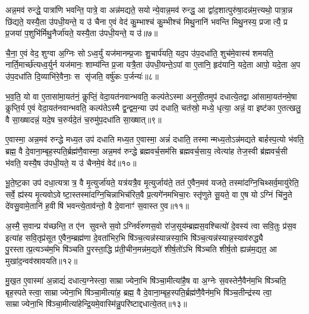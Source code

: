 अन्न॒मव॑ रुन्द्धे॒ पात्रा॑णि भवन्ति॒ पात्रे॒ वा अन्न॑मद्यते॒ सयोन्ये॒वान्न॒मव॑ रुन्द्ध॒ आ द्वा॑द॒शात्पुरु॑षा॒दन्न॑म॒त्त्यथो॒ पात्रा॒न्न छि॑द्यते॒ यस्यै॒ता उ॑पधी॒यन्ते॒ य उ॑ चैना ए॒वं वेद॑ कु॒म्भाश्च॑ कु॒म्भीश्च॑ मिथु॒नानि॑ भवन्ति मिथु॒नस्य॒ प्रजात्यै॒ प्र प्र॒जया॑ प॒शुभि॑र्मिथु॒नैर्जा॑यते॒ यस्यै॒ता उ॑पधी॒यन्ते॒ य उ॑॥७॥

चै॒ना॒ ए॒वं वेद॒ शुग्वा अ॒ग्निः सोऽध्व॒र्युं यज॑मानम्प्र॒जाः शु॒चार्प॑यति॒ यद॒प उ॑प॒दधा॑ति॒ शुच॑मे॒वास्य॑ शमयति॒ नार्ति॒मार्च्छ॑त्यध्व॒र्युर्न यज॑मानः॒ शाम्य॑न्ति प्र॒जा यत्रै॒ता उ॑पधी॒यन्ते॒ऽपां वा ए॒तानि॒ हृद॑यानि॒ यदे॒ता आपो॒ यदे॒ता अ॒प उ॑प॒दधा॑ति दि॒व्याभि॑रे॒वैनाः॒ स सृ॑जति॒ वर्\mbox{}षु॑कः प॒र्जन्यः॑॥८॥

भ॒व॒ति॒ यो वा ए॒तासा॑मा॒यत॑नं॒ कॢप्तिं॒ वेदा॒यत॑नवान्भवति॒ कल्प॑तेऽस्मा अनुसी॒तमुप॑ दधात्ये॒तद्वा आ॑सामा॒यत॑नमे॒षा कॢप्ति॒र्य ए॒वं वेदा॒यत॑नवान्भवति॒ कल्प॑तेऽस्मै द्व॒न्द्वम॒न्या उप॑ दधाति॒ चत॑स्रो॒ मध्ये॒ धृत्या॒ अन्नं॒ वा इष्ट॑का ए॒तत्खलु॒ वै सा॒ख्षादन्नं॒ यदे॒ष च॒रुर्यदे॒तं च॒रुमु॑प॒दधा॑ति सा॒ख्षात्॥९॥

ए॒वास्मा॒ अन्न॒मव॑ रुन्द्धे मध्य॒त उप॑ दधाति मध्य॒त ए॒वास्मा॒ अन्नं॑ दधाति॒ तस्मान्मध्य॒तोऽन्न॑मद्यते बार्\mbox{}हस्प॒त्यो भ॑वति॒ ब्रह्म॒ वै दे॒वाना॒म्बृह॒स्पति॒र्ब्रह्म॑णै॒वास्मा॒ अन्न॒मव॑ रुन्द्धे ब्रह्मवर्च॒सम॑सि ब्रह्मवर्च॒साय॒ त्वेत्या॑ह तेज॒स्वी ब्र॑ह्मवर्च॒सी भ॑वति॒ यस्यै॒ष उ॑पधी॒यते॒ य उ॑ चैनमे॒वं वेद॑॥१०॥

{\anuvakamend[{अ॒मृत॑मस्मै जायते॒ यस्यै॒ता उ॑पधी॒यन्ते॒ य उ॑ प॒र्जन्य॑ उप॒दधा॑ति सा॒ख्षात्स॒प्तच॑त्वारिशच्च॥२॥}]}

भू॒ते॒ष्ट॒का उप॑ दधा॒त्यत्रात्र॒ वै मृ॒त्युर्जा॑यते॒ यत्र॑यत्रै॒व मृ॒त्युर्जाय॑ते॒ तत॑ ए॒वैन॒मव॑ यजते॒ तस्मा॑दग्नि॒चिथ्सर्व॒मायु॑रेति॒ सर्वे॒ ह्य॑स्य मृ॒त्यवोऽवेष्टा॒स्तस्मा॑दग्नि॒चिन्नाभिच॑रित॒वै प्र॒त्यगे॑नमभिचा॒रः स्तृ॑णुते सू॒यते॒ वा ए॒ष योऽग्निं चि॑नु॒ते दे॑वसु॒वामे॒तानि॑ ह॒वीषि॑ भवन्त्ये॒ताव॑न्तो॒ वै दे॒वानाꣳ॑ स॒वास्त ए॒व॥११॥

अ॒स्मै॒ स॒वान्प्र य॑च्छन्ति॒ त ए॑न सुवन्ते स॒वोऽग्निर्व॑रुणस॒वो रा॑ज॒सूय॑म्ब्रह्मस॒वश्चित्यो॑ दे॒वस्य॑ त्वा सवि॒तुः प्र॑स॒व इत्या॑ह सवि॒तृप्र॑सूत ए॒वैन॒म्ब्रह्म॑णा दे॒वता॑भिर॒भि षि॑ञ्च॒त्यन्न॑स्यान्नस्या॒भि षि॑ञ्च॒त्यन्न॑स्यान्न॒स्याव॑रुद्ध्यै पु॒रस्तात्प्र॒त्यञ्च॑म॒भि षि॑ञ्चति पु॒रस्ता॒द्धि प्र॑ती॒चीन॒मन्न॑म॒द्यते॑ शीर्\mbox{}ष॒तो॑ऽभि षि॑ञ्चति शीर्\mbox{}ष॒तो ह्यन्न॑म॒द्यत॒ आ मुखा॑द॒न्वव॑स्रावयति॥१२॥

मु॒ख॒त ए॒वास्मा॑ अ॒न्नाद्यं॑ दधात्य॒ग्नेस्त्वा॒ साम्राज्येना॒भि षि॑ञ्चा॒मीत्या॑है॒ष वा अ॒ग्नेः स॒वस्तेनै॒वैन॑म॒भि षि॑ञ्चति॒ बृह॒स्पतेस्त्वा॒ साम्राज्येना॒भि षि॑ञ्चा॒मीत्या॑ह॒ ब्रह्म॒ वै दे॒वाना॒म्बृह॒स्पति॒र्ब्रह्म॑णै॒वैन॑म॒भि षि॑ञ्च॒तीन्द्र॑स्य त्वा॒ साम्राज्येना॒भि षि॑ञ्चा॒मीत्या॑हेन्द्रि॒यमे॒वास्मि॑न्नु॒परि॑ष्टाद्दधात्ये॒तत्॥१३॥

